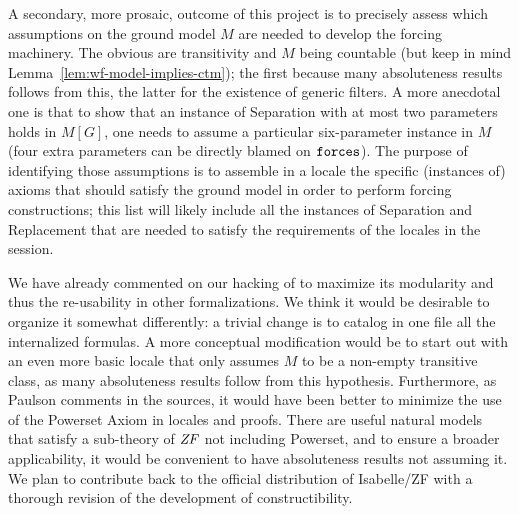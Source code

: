 A secondary, more prosaic, outcome of this project is to precisely
assess which assumptions on the ground model $M$ are needed to develop
the forcing machinery. The obvious are transitivity and $M$ being
countable (but keep in mind Lemma~\ref{lem:wf-model-implies-ctm}); the
first because many absoluteness results follows from this, the latter
for the existence of generic filters. A
more anecdotal one is that to show that an instance of Separation
with at most two parameters holds in $M[G]$, one needs to assume a
particular  six-parameter
instance in $M$ (four extra parameters can be directly blamed on
$\mathop{\mathtt{forces}}$).  The purpose of identifying those assumptions is to assemble
in a locale the specific (instances of) axioms that should satisfy the
ground model in order to perform forcing constructions; this list will
likely include all the instances of Separation and Replacement that
are needed to satisfy the requirements of the locales in the
 session.

We have already commented on our hacking of 
to maximize its modularity and thus the re-usability in other
formalizations. We think it would be desirable to organize it
somewhat differently: a trivial change is to catalog in one file all
the internalized formulas. A more
conceptual modification would be to start out with an even more basic
locale that only assumes $M$ to be a non-empty transitive class, as
many absoluteness results follow from this hypothesis. Furthermore, as
Paulson comments in the 
sources, it would have been better to minimize the use of the Powerset
Axiom in locales and proofs. There are useful natural models that
satisfy a sub-theory of $\mathit{ZF}$ not including Powerset, and to ensure a
broader applicability, it would be convenient to have absoluteness
results not assuming it. We plan to contribute back to the official
distribution of Isabelle/ZF with a thorough revision of the development of
constructibility.



